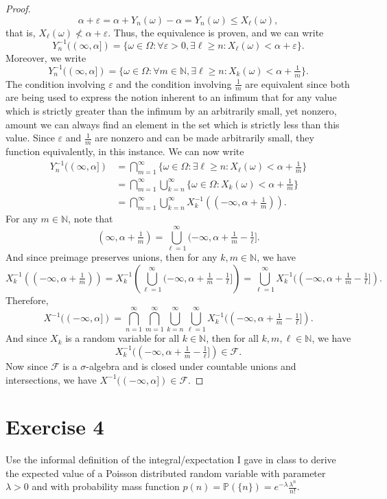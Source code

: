 \documentclass[12pt]{article}
\newenvironment{problem}
    {\begin{lrbox}{\mybox}\begin{minipage}{0.98\textwidth}}
    {\end{minipage}\end{lrbox}\framebox[\textwidth]{\usebox{\mybox}}}
\newcommand{\ds}{\displaystyle}
\let\eps\varepsilon %
\newcommand{\N}{\mathbb{N}} %
\renewcommand{\P}{\mathbb{P}} %
\newcommand{\FF}{\mathcal{F}} %
\newcommand{\<}{\left\langle} %
\renewcommand{\>}{\right\rangle} %
\begin{document}
\begin{proof}
    \[\alpha + \eps = \alpha + Y_n(\omega) - \alpha = Y_n(\omega) \leq X_\ell(\omega),\]
    that is, $X_\ell(\omega) \not< \alpha +\eps.$ Thus, the equivalence is proven, and we can write
    \[Y_n^{-1}((\infty,\alpha]) = \{\omega\in\Omega : \forall\eps>0, \exists \ell\geq n : X_\ell(\omega) < \alpha + \eps\}.\]
    Moreover, we write
    \[Y_n^{-1}((\infty,\alpha]) = \{\omega\in\Omega : \forall m\in\N, \exists \ell\geq n : X_k(\omega) < \alpha + \tfrac1m\}.\]
    The condition involving $\eps$ and the condition involving $\frac1m$ are equivalent since both are being used to express the notion inherent to an infimum that for any value which is strictly greater than the infimum by an arbitrarily small, yet nonzero, amount we can always find an element in the set which is strictly less than this value. Since $\eps$ and $\frac1m$ are nonzero and can be made arbitrarily small, they function equivalently, in this instance. We can now write
    \begin{align*}
        Y_n^{-1}((\infty,\alpha])
            &= \bigcap_{m=1}^\infty\{\omega\in\Omega : \exists \ell\geq n : X_\ell(\omega) < \alpha + \tfrac1m\} \\
            &= \bigcap_{m=1}^\infty\bigcup_{k=n}^\infty\{\omega\in\Omega : X_k(\omega) < \alpha + \tfrac1m\} \\
            &= \bigcap_{m=1}^\infty\bigcup_{k=n}^\infty X_k^{-1}((-\infty,\alpha + \tfrac1m)).
    \end{align*}
    For any $m\in\N$, note that
    \[(\infty, \alpha + \tfrac1m) = \bigcup_{\ell=1}^\infty(-\infty, \alpha + \tfrac1m - \tfrac1\ell].\]
    And since preimage preserves unions, then for any $k,m\in\N$, we have
    \[X_k^{-1}((-\infty,\alpha + \tfrac1m)) = X_k^{-1}\left(\bigcup_{\ell=1}^\infty(-\infty, \alpha + \tfrac1m - \tfrac1\ell]\right) = \bigcup_{\ell=1}^\infty X_k^{-1}((-\infty, \alpha + \tfrac1m - \tfrac1\ell]).\]
    Therefore,
    \[X^{-1}((-\infty,\alpha]) = \bigcap_{n=1}^\infty\bigcap_{m=1}^\infty\bigcup_{k=n}^\infty\bigcup_{\ell=1}^\infty X_k^{-1}((-\infty, \alpha + \tfrac1m - \tfrac1\ell]).\]
    And since $X_k$ is a random variable for all $k\in\N$, then for all $k,m,\ell\in\N$, we have
    \[X_k^{-1}((-\infty, \alpha + \tfrac1m - \tfrac1\ell]) \in \FF.\]
    Now since $\FF$ is a $\sigma$-algebra and is closed under countable unions and intersections, we have $X^{-1}((-\infty,\alpha])\in\FF$.
    
\end{proof}

\newpage
\section*{Exercise 4}
\begin{problem}
    Use the informal definition of the integral/expectation I gave in class to derive the expected value of a Poisson distributed random variable with parameter $\lambda>0$ and with probability mass function $p(n)=\P(\{n\}) = e^{-\lambda} \ds\frac{\lambda^n}{n!}$.
\end{problem}
\end{document}

